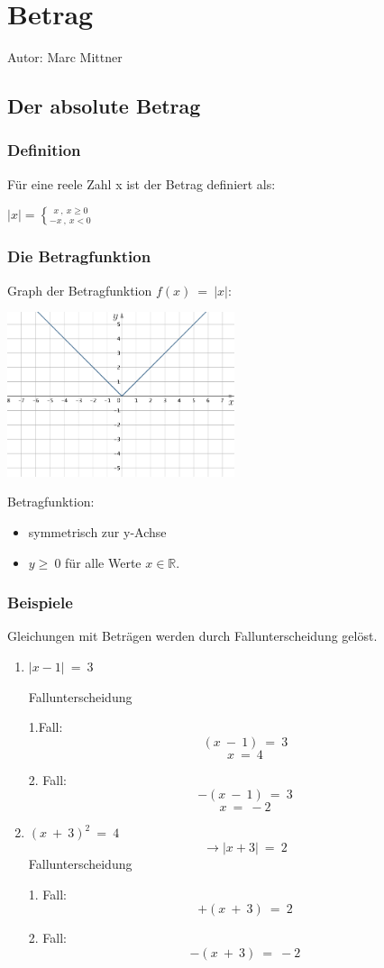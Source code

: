 \chapter{Betrag}

Autor: Marc Mittner

\section{Der absolute Betrag}

\subsection{Definition}

Für eine reele Zahl x ist der Betrag definiert als: 

\Large
$ | x | =  \left\{ ^{ \ \  x \ , \ x \geq 0}_{-x \ , \ x < 0} \right. $
\normalsize

\subsection{Die Betragfunktion}
Graph der Betragfunktion $ f(x) \ = \ |x| $:
\begin{center}
\includegraphics[width=0.5\textwidth]{img/Betragsfkt.png}
\end{center}
Betragfunktion:
\begin{itemize}
\item symmetrisch zur y-Achse 
\item $y \geq \ 0$ für alle Werte $ x \in \mathbb{R} $.
\end{itemize}

\subsection{Beispiele}
Gleichungen mit Beträgen werden durch Fallunterscheidung gelöst.
\begin{enumerate}
 \item $ | x-1 | \ = \ 3 $

Fallunterscheidung

1.Fall:
\[ (x \ - \ 1) \ = \ 3 \] 
\[ x \ = \ 4 \] 


2. Fall:
\[-(x \ - \ 1) \ = \ 3 \]
\[ x \ = \ -2 \]


\item $ (x \ + \ 3)^2 \ = \ 4 $
\[ \rightarrow | x+3 | \ = \ 2 \]
Fallunterscheidung

1. Fall:
\[ +(x \ + \ 3) \ = \ 2 \]

2. Fall:
\[ -(x \ + \ 3) \ = \ -2 \]
\end{enumerate}
